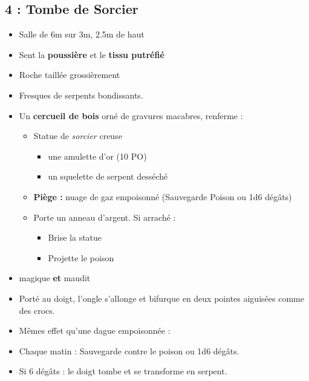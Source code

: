 \subsection{4 : Tombe de Sorcier}\label{n1:s4}
\begin{itemize}
  \item Salle de 6m sur 3m, 2.5m de haut
  \item Sent la \textbf{poussière} et le \textbf{tissu putréfié}
  \item Roche taillée grossièrement
  \item Fresques de serpents bondissants.
  \item Un \textbf{cercueil de bois} orné de gravures macabres, renferme :
  \begin{itemize}
    \item Statue de \emph{sorcier} creuse
    \begin{itemize}
      \item une amulette d'or (10 PO)
      \item un squelette de serpent desséché
    \end{itemize}
    \item \textbf{Piège :} nuage de gaz empoisonné (Sauvegarde Poison ou 1d6 dégâts)
    \item Porte un anneau d'argent. Si arraché :
    \begin{itemize}
      \item Brise la statue
      \item Projette le poison
    \end{itemize}
  \end{itemize}
\end{itemize}

\begin{highlight}
  \vspace*{-\baselineskip}
  \begin{itemize}
    \item magique \textbf{et} maudit
    \item Porté au doigt, l'ongle s'allonge et bifurque en deux pointes aiguisées comme des crocs.
    \item Mêmes effet qu'une dague empoisonnée :
    \item Chaque matin  : Sauvegarde contre le poison ou 1d6 dégâts.
    \item Si 6 dégâts :  le doigt tombe et se transforme en serpent.
  \end{itemize}
\end{highlight}

